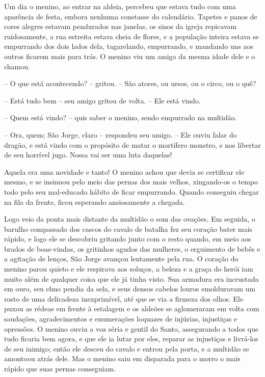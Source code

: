Um dia o menino, ao entrar na aldeia, percebeu que estava tudo com uma
aparência de festa, embora nenhuma constasse do calendário. Tapetes e
panos de cores alegres estavam pendurados nas janelas, os sinos da
igreja repicavam ruidosamente, a rua estreita estava cheia de flores,
e a população inteira estava se empurrando dos dois lados dela,
tagarelando, empurrando, e mandando uns aos outros ficarem mais para
trás. O menino viu um amigo da mesma idade dele e o chamou. 

-- O que está acontecendo? -- gritou. -- São atores, ou ursos, ou o
circo, ou o quê?

-- Está tudo bem -- seu amigo gritou de volta. -- Ele está vindo.

-- Quem está vindo? -- quis saber o menino, sendo empurrado na multidão.

-- Ora, quem; São Jorge, claro -- respondeu seu amigo. -- Ele ouviu falar
do dragão, e está vindo com o propósito de matar o mortífero monstro,
e nos libertar de seu horrível jugo. Nossa vai ser uma luta daquelas!

Aquela era uma novidade e tanto! O menino achou que devia se
certificar ele mesmo, e se insinuou pelo meio das pernas dos mais
velhos, xingando-os o tempo todo pelo seu mal-educado hábito de ficar
empurrando. Quando conseguiu chegar na fila da frente, ficou
esperando ansiosamente a chegada.

Logo veio da ponta mais distante da multidão o som das ovações. Em
seguida, o barulho compassado dos cascos do cavalo de batalha fez seu
coração bater mais rápido, e logo ele se descobriu gritando junto com
o resto quando, em meio aos brados de boas-vindas, os gritinhos
agudos das mulheres, o erguimento de bebês e a agitação de lenços,
São Jorge avançou lentamente pela rua. O coração do menino parou
quieto e ele respirava aos soluços, a beleza e a graça do herói iam
muito além de qualquer coisa que ele já tinha visto. Sua armadura era
incrustada em ouro, seu elmo pendia da sela, e seus densos cabelos
louros emolduravam um rosto de uma delicadeza inexprimível, até que
se via a firmeza dos olhos. Ele puxou as rédeas em frente à estalagem
e os aldeões se aglomeraram em volta com saudações, agradecimentos e
enumerações loquazes de injúrias, injustiças e opressões. O menino
ouviu a voz séria e gentil do Santo, assegurando a todos que tudo
ficaria bem agora, e que ele ia lutar por eles, reparar as injustiças
e livrá-los de seu inimigo; então ele desceu do cavalo e entrou pela
porta, e a multidão se amontoou atrás dele. Mas o menino saiu em
disparada para o morro o mais rápido que suas pernas conseguiam.

